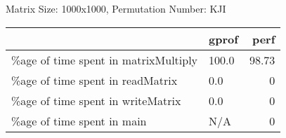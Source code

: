 \documentclass{article}
\begin{document}
    Matrix Size: 1000x1000, Permutation Number: KJI \\
    \begin{tabular}{llr}
\hline
                                      & gprof   &   perf \\
\hline
 \%age of time spent in matrixMultiply & 100.0   &  98.73 \\
 \%age of time spent in readMatrix     & 0.0     &   0    \\
 \%age of time spent in writeMatrix    & 0.0     &   0    \\
 \%age of time spent in main           & N/A     &   0    \\
\hline
\end{tabular}
    
\end{document}
